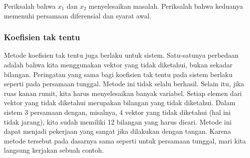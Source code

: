 \begin{exercise}
Periksalah bahwa $x_1$ dan $x_2$ menyelesaikan masalah.  Periksalah bahwa keduanya
memenuhi persamaan diferensial dan syarat awal.
\end{exercise}

\subsubsection{Koefisien tak tentu}

Metode
koefisien tak tentu juga
berlaku untuk sistem.
Satu-satunya
perbedaan adalah bahwa kita menggunakan vektor yang tidak diketahui, bukan sekadar
bilangan.  Peringatan yang sama bagi koefisien tak tentu pada sistem
berlaku seperti pada persamaan tunggal.  Metode ini tidak selalu berhasil.
Selain itu, jika ruas kanan rumit, kita harus menyelesaikan
banyak
variabel.  Setiap elemen dari
vektor yang tidak diketahui merupakan bilangan yang tidak diketahui.  Dalam sistem 3 persamaan dengan,
misalnya, 4 vektor yang tidak diketahui (hal ini tidak jarang), kita sudah memiliki 12
bilangan yang harus dicari.
Metode ini dapat menjadi pekerjaan yang sangat
jika dilakukan dengan tangan.
Karena metode tersebut pada dasarnya sama seperti untuk persamaan tunggal,
mari kita langsung kerjakan sebuah contoh.

